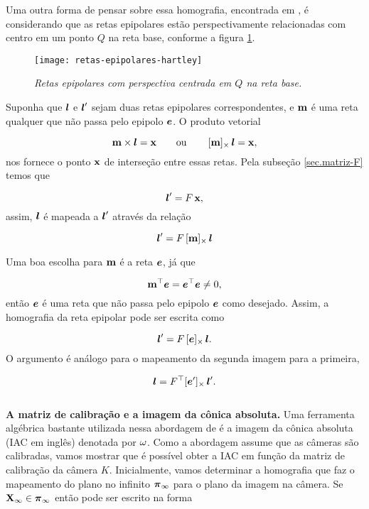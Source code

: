 Uma outra forma de pensar sobre essa homografia, encontrada em \cite{Hartley2004}, é considerando que as retas epipolares estão perspectivamente relacionadas com centro em um ponto $Q$ na reta base, conforme a figura \ref{fig.retas-epi-hartley}.

\begin{figure}[!htb]
\centering
\texttt{[image: retas-epipolares-hartley]}
\caption{\textit{Retas epipolares com perspectiva centrada em $Q$ na reta base.}}
\label{fig.retas-epi-hartley}
\end{figure}


Suponha que $\boldsymbol{l}$ e $\boldsymbol{l}'$ sejam duas retas epipolares correspondentes, e ${\bf m}$ é uma reta qualquer que não passa pelo epipolo $\boldsymbol{e}$. O produto vetorial 

\begin{equation}
{\bf m}\times\boldsymbol{l}=\mathbf{x}\qquad\text{ou}\qquad\,[{\bf m}]_\times\,\boldsymbol{l}=\mathbf{x},
\end{equation}
nos fornece o ponto $\mathbf{x}$ de interseção entre essas retas. Pela subseção \ref{sec.matriz-F} temos que

\begin{equation*}
\boldsymbol{l}'=F\,\mathbf{x},
\end{equation*} 
assim, $\boldsymbol{l}$ é mapeada a $\boldsymbol{l}'$ através da relação 

\begin{equation*}
\boldsymbol{l}'=F\,[{\bf m}]_\times\,\boldsymbol{l}
\end{equation*}


Uma boa escolha para ${\bf m}$ é a reta $\boldsymbol{e}$, já que

\begin{equation*}
{\bf m}^\top\boldsymbol{e}=\boldsymbol{e}^\top\boldsymbol{e}\neq0,
\end{equation*}
então $\boldsymbol{e}$ é uma reta que não passa pelo epipolo $\boldsymbol{e}$ como desejado. Assim, a homografia da reta epipolar pode ser escrita como 

\begin{equation*}
\boldsymbol{l}'=F\,[\boldsymbol{e}]_\times\,\boldsymbol{l}.
\end{equation*}
O argumento é análogo para o mapeamento da segunda imagem para a primeira,

\begin{equation*}
\boldsymbol{l}=F^\top [\boldsymbol{e}']_\times\,\boldsymbol{l}'.
\end{equation*}\\

{\bf A matriz de calibração e a imagem da cônica absoluta.} Uma ferramenta algébrica bastante utilizada nessa abordagem de \citep{2503343} é a imagem da cônica absoluta (IAC em inglês) denotada por ${\bf \omega}$. Como a abordagem assume que as câmeras são calibradas, vamos mostrar que é possível obter a IAC em função da matriz de calibração da câmera $K$. Inicialmente, vamos determinar a homografia que faz o mapeamento do plano no infinito $\boldsymbol{\pi}_\infty$ para o plano da imagem na câmera. Se $\mathbf{X}_\infty\in\boldsymbol{\pi}_\infty$ então pode ser escrito na forma

